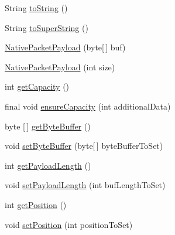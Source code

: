\begin{DoxyCompactItemize}
\item 
String \mbox{\hyperlink{classcom_1_1mysql_1_1cj_1_1protocol_1_1a_1_1_native_packet_payload_a5cf38824eb92c94a8282c2c5a4176807}{to\+String}} ()
\item 
String \mbox{\hyperlink{classcom_1_1mysql_1_1cj_1_1protocol_1_1a_1_1_native_packet_payload_aa97701b593cd96d676faffcc0d8c39b9}{to\+Super\+String}} ()
\item 
\mbox{\hyperlink{classcom_1_1mysql_1_1cj_1_1protocol_1_1a_1_1_native_packet_payload_a510e5503de0411a6a71d4d49d8be1b63}{Native\+Packet\+Payload}} (byte\mbox{[}$\,$\mbox{]} buf)
\item 
\mbox{\hyperlink{classcom_1_1mysql_1_1cj_1_1protocol_1_1a_1_1_native_packet_payload_a8a2eaf0647d9df50af08e7d34ff95916}{Native\+Packet\+Payload}} (int size)
\item 
int \mbox{\hyperlink{classcom_1_1mysql_1_1cj_1_1protocol_1_1a_1_1_native_packet_payload_ac1c1fac4baf8675645a98e43fef6ffc9}{get\+Capacity}} ()
\item 
final void \mbox{\hyperlink{classcom_1_1mysql_1_1cj_1_1protocol_1_1a_1_1_native_packet_payload_a5ac2d3e7b29e3d19ba69dd7cc2942856}{ensure\+Capacity}} (int additional\+Data)
\item 
byte \mbox{[}$\,$\mbox{]} \mbox{\hyperlink{classcom_1_1mysql_1_1cj_1_1protocol_1_1a_1_1_native_packet_payload_a9aad2cb05c0a41d027987a601991e1a0}{get\+Byte\+Buffer}} ()
\item 
void \mbox{\hyperlink{classcom_1_1mysql_1_1cj_1_1protocol_1_1a_1_1_native_packet_payload_a291159b7dd115f45c9c384f59c33ebbb}{set\+Byte\+Buffer}} (byte\mbox{[}$\,$\mbox{]} byte\+Buffer\+To\+Set)
\item 
int \mbox{\hyperlink{classcom_1_1mysql_1_1cj_1_1protocol_1_1a_1_1_native_packet_payload_aabf5bb67ce83f25d25373f902c403754}{get\+Payload\+Length}} ()
\item 
void \mbox{\hyperlink{classcom_1_1mysql_1_1cj_1_1protocol_1_1a_1_1_native_packet_payload_af87d8023608d4744b22b047335ac69a5}{set\+Payload\+Length}} (int buf\+Length\+To\+Set)
\item 
int \mbox{\hyperlink{classcom_1_1mysql_1_1cj_1_1protocol_1_1a_1_1_native_packet_payload_a89ff1dc3fa0998b1362a9fc2351d6797}{get\+Position}} ()
\item 
void \mbox{\hyperlink{classcom_1_1mysql_1_1cj_1_1protocol_1_1a_1_1_native_packet_payload_aa6b85c7f35aa9286b9b6f462dd82623d}{set\+Position}} (int position\+To\+Set)
\item 

\end{DoxyCompactItemize}
